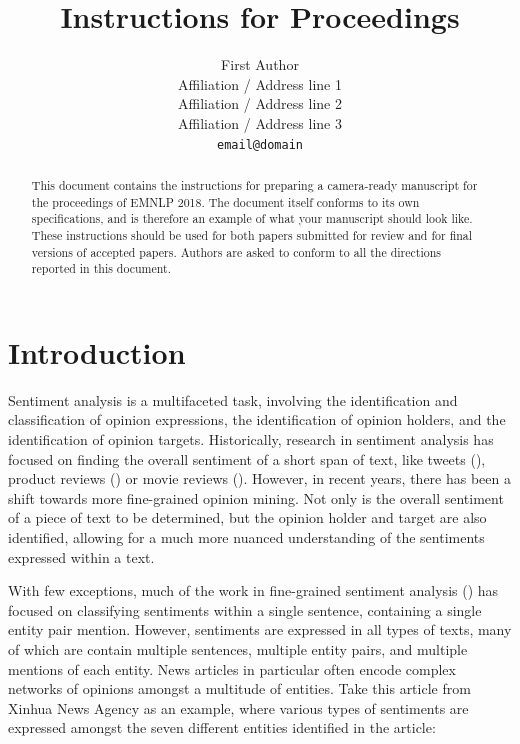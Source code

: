 \documentclass[11pt,a4paper]{article}
\title{Instructions for \confname{} Proceedings}
\author{First Author \\
  Affiliation / Address line 1 \\
  Affiliation / Address line 2 \\
  Affiliation / Address line 3 \\
  {\tt email@domain} \\}
\date{}
\newcommand\confname{EMNLP 2018}
\begin{document}
\maketitle
\begin{abstract}
  This document contains the instructions for preparing a camera-ready
  manuscript for the proceedings of \confname{}. The document itself
  conforms to its own specifications, and is therefore an example of
  what your manuscript should look like. These instructions should be
  used for both papers submitted for review and for final versions of
  accepted papers.  Authors are asked to conform to all the directions
  reported in this document.
\end{abstract}

\section{Introduction}
Sentiment analysis is a multifaceted task, involving the identification and classification of opinion expressions, the identification of opinion holders, and the identification of opinion targets.
Historically, research in sentiment analysis has focused on finding the overall sentiment of a short span of text, like tweets (), product reviews () or movie reviews ().
However, in recent years, there has been a shift towards more fine-grained opinion mining.
Not only is the overall sentiment of a piece of text to be determined, but the opinion holder and target are also identified, allowing for a much more nuanced understanding of the sentiments expressed within a text.
\par With few exceptions, much of the work in fine-grained sentiment analysis () has focused on classifying sentiments within a single sentence, containing a single entity pair mention.
However, sentiments are expressed in all types of texts, many of which are contain multiple sentences, multiple entity pairs, and multiple mentions of each entity.
News articles in particular often encode complex networks of opinions amongst a multitude of entities.
Take this article from Xinhua News Agency as an example, where various types of sentiments are expressed amongst the seven different entities identified in the article:
\end{document}

